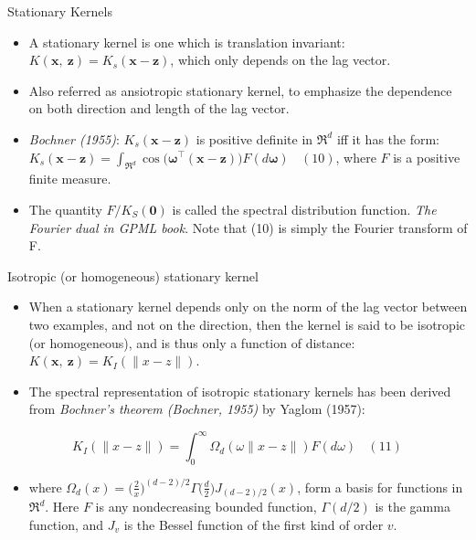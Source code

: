 \documentclass[
  ignorenonframetext,
]{beamer}
\providecommand{\tightlist}{%
  \setlength{\itemsep}{0pt}\setlength{\parskip}{0pt}}
\begin{document}
\begin{frame}{Stationary Kernels}
\begin{itemize}
\item
  A stationary kernel is one which is translation invariant:
  \(K(\pmb x,\ \pmb z) = K_s (\pmb x - \pmb z)\), which only depends on
  the lag vector.
\item
  Also referred as ansiotropic stationary kernel, to emphasize the
  dependence on both direction and length of the lag vector.
\item
  \emph{Bochner (1955)}: \(K_s (\pmb x - \pmb z)\) is positive definite
  in \(\mathfrak R^d\) iff it has the form:
  \(K_s (\pmb x - \pmb z) = \int _{\mathfrak R^d} \cos \big(\pmb \omega ^{\top} (\pmb x - \pmb z)\big) F(d\pmb \omega) \ \ \ \ (10)\),
  where \(F\) is a positive finite measure.
\item
  The quantity \(F / K_S(\pmb 0)\) is called the spectral distribution
  function. \emph{The Fourier dual in GPML book}. Note that (10) is
  simply the Fourier transform of F.
\end{itemize}
\end{frame}

\begin{frame}{Isotropic (or homogeneous) stationary kernel}
\protect\hypertarget{isotropic-or-homogeneous-stationary-kernel}{}
\begin{itemize}
\item
  When a stationary kernel depends only on the norm of the lag vector
  between two examples, and not on the direction, then the kernel is
  said to be isotropic (or homogeneous), and is thus only a function of
  distance: \(K(\pmb x,\ \pmb z) = K_I(\|x - z\|)\).
\item
  The spectral representation of isotropic stationary kernels has been
  derived from \emph{Bochner's theorem (Bochner, 1955)} by Yaglom
  (1957):
\end{itemize}

\[
K_I(\|x - z\|) = \int_0^\infty \Omega_d (\omega\|x - z\|)F(d\omega) \ \ \ \ (11)
\]

\begin{itemize}
\tightlist
\item
  where
  \(\Omega_d(x) = \Big({\frac 2 x}\Big)^{(d-2)/2} \Gamma \Big({\frac d 2}\Big) J_{(d-2)/2}(x)\),
  form a basis for functions in \(\mathfrak R^d\). Here \(F\) is any
  nondecreasing bounded function, \(\Gamma(d/2)\) is the gamma function,
  and \(J_v\) is the Bessel function of the first kind of order \(v\).
\end{itemize}
\end{frame}
\end{document}
